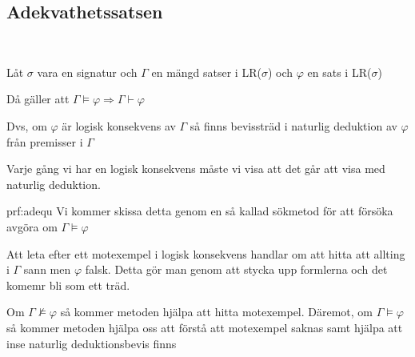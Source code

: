 \subsection{Adekvathetssatsen}\hfill\\\par
\noindent Låt $\sigma$ vara en signatur och $\Gamma$ en mängd satser i LR($\sigma$) och $\varphi$ en sats i LR($\sigma$)\par
\noindent Då gäller att $\Gamma\vDash\varphi\Rightarrow\Gamma\vdash\varphi$\par
\noindent Dvs, om $\varphi$ är logisk konsekvens av $\Gamma$ så finns bevissträd i naturlig deduktion av $\varphi$ från premisser i $\Gamma$
\par\bigskip
\noindent Varje gång vi har en logisk konsekvens måste vi visa att det går att visa med naturlig deduktion.
\par\bigskip
\begin{prf}[Adekvathetssatsen]{prf:adequ}
  \noindent Vi kommer skissa detta genom en så kallad sökmetod för att försöka avgöra om $\Gamma\vDash\varphi$\par
  \noindent Att leta efter ett motexempel i logisk konsekvens handlar om att hitta att allting i $\Gamma$ sann men $\varphi$ falsk. Detta gör man genom att stycka upp formlerna och det komemr bli som ett träd. \par\bigskip
  \noindent Om $\Gamma\nvDash\varphi$ så kommer metoden hjälpa att hitta motexempel. Däremot, om $\Gamma\vDash\varphi$ så kommer metoden hjälpa oss att förstå att motexempel saknas samt hjälpa att inse naturlig deduktionsbevis finns 
\end{prf}
